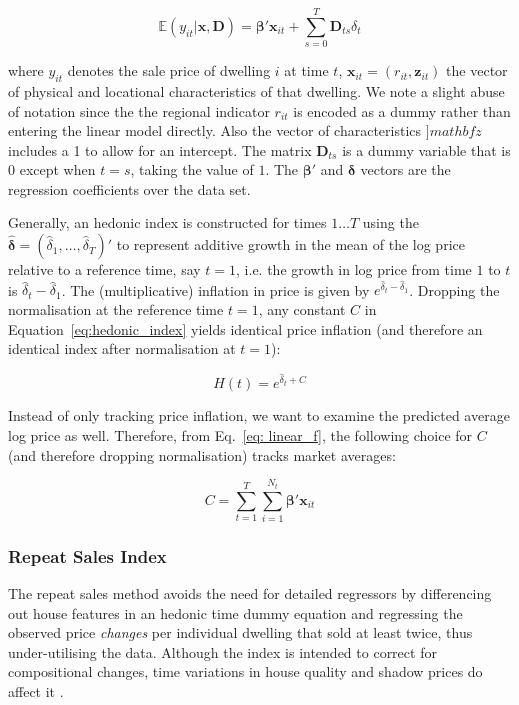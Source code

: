 \begin{equation}
  \label{eq: linear_f}
\mathbb{E}(y_{it} \vert \mathbf{x}, \mathbf{D}) =  \mathbf{\beta}' \mathbf{x}_{it} + \sum_{s=0}^{T} \mathbf{D}_{ts} \delta_t 
\end{equation}

where $y_{it}$ denotes the sale price of dwelling $i$ at time $t$, $\mathbf{x}_{it}=(r_{it}, \mathbf{z}_{it})$ the vector of physical and locational characteristics of that dwelling. We note a slight abuse of notation since the the regional indicator $r_{it}$ is encoded as a dummy rather than entering the linear model directly. Also the vector of characteristics $]mathbf{z}$ includes a 1 to allow for an intercept. The matrix $\mathbf{D}_{ts}$ is a dummy variable that is $0$ except when $t=s$, taking the value of $1$. The $\mathbf{\beta}'$ and $\mathbf{\delta}$ vectors are the regression coefficients over the data set.

Generally, an hedonic index is constructed for times $1 \dots T$ using the $\hat{\mathbf{\delta}}=(\hat\delta_1,\dots,\hat\delta_T)'$ to represent additive growth in the mean of the log price relative to a reference time, say $t=1$, i.e. the growth in log price from time $1$ to $t$ is $\hat\delta_{t} - \hat\delta_{1}$. The (multiplicative) inflation in price is given by $e^{\hat\delta_{t} - \hat\delta_{1}}$. 
Dropping the normalisation at the reference time $t=1$, any constant $C$ in Equation~\ref{eq:hedonic_index} yields identical price inflation (and therefore an identical index after normalisation at $t=1$):
  
  \begin{equation}
  \label{eq:hedonic_index}
  H(t) = e^{\hat\delta_{t} + C }
  \end{equation}


Instead of only tracking price inflation, we want to examine the predicted average log price as well. Therefore, from Eq.~\ref{eq: linear_f}, the following choice for $C$ (and therefore dropping normalisation) tracks market averages:

\[
C=\sum_{t=1}^{T}\sum_{i=1}^{N_{t}} \mathbf{\beta}' \mathbf{x}_{it}
\]


\subsubsection{Repeat Sales Index}

The repeat sales method \cite{bailey:1963, k_case:1987}  avoids the need for detailed regressors by differencing out house features in an hedonic time dummy equation and regressing the observed price \emph{changes} per individual dwelling that sold at least twice, thus under-utilising the data. Although the index is intended to correct for compositional changes, time variations in house quality and shadow prices do affect it \citep{mcmillen2012}.  

